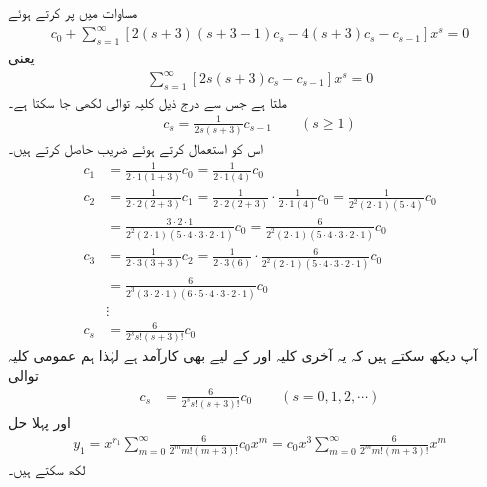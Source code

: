 مساوات  میں  پر کرتے ہوئے
 \begin{align*}
[2\cdot 3(3-1)-4\cdot 3]c_0+\sum_{s=1}^{\infty}[2 (s+3)(s+3-1)c_s-4(s+3)c_s-c_{s-1}]x^{s}=0
\end{align*}
یعنی
 \begin{align*}
\sum_{s=1}^{\infty}[2s(s+3)c_s-c_{s-1}]x^{s}=0
\end{align*}
ملتا ہے جس سے درج ذیل کلیہ توالی لکھی جا سکتا ہے۔
\begin{align*}
c_s=\frac{1}{2s(s+3)}c_{s-1}\quad \quad (s\ge 1)
\end{align*}
اس کو استعمال کرتے ہوئے  ضریب  حاصل کرتے ہیں۔
\begin{align*}
c_1&=\frac{1}{2\cdot 1(1+3)}c_0=\frac{1}{2\cdot 1 (4)}c_0\\
c_2&=\frac{1}{2\cdot 2(2+3)}c_1=\frac{1}{2\cdot 2(2+3)}\cdot \frac{1}{2\cdot 1 (4)}c_0=\frac{1}{2^2(2\cdot 1)(5\cdot 4)}c_0\\
&=\frac{3\cdot 2\cdot 1}{2^2(2\cdot 1)(5\cdot 4\cdot 3\cdot 2\cdot 1)}c_0=\frac{6}{2^2(2\cdot 1)(5\cdot 4\cdot 3\cdot 2\cdot 1)}c_0\\
c_3&=\frac{1}{2\cdot 3(3+3)}c_2=\frac{1}{2\cdot 3(6)}\cdot \frac{6}{2^2(2\cdot 1)(5\cdot 4\cdot 3\cdot 2\cdot 1)}c_0\\
&=\frac{6}{2^3(3\cdot 2\cdot 1)(6\cdot 5\cdot 4\cdot 3\cdot 2\cdot 1)}c_0\\
&\vdots\\
c_s&=\frac{6}{2^s s!(s+3)!}c_0
\end{align*}
آپ دیکھ سکتے ہیں کہ یہ آخری کلیہ  اور  کے لیے بھی کارآمد ہے لہٰذا ہم عمومی کلیہ توالی
\begin{align*}
c_s&=\frac{6}{2^s s!(s+3)!}c_0\quad \quad (s=0,1,2,\cdots)
\end{align*}
اور پہلا حل
\begin{align*}
y_1=x^{r_1}\sum_{m=0}^{\infty}\frac{6}{2^m m!(m+3)!}c_0x^m=c_0x^3\sum_{m=0}^{\infty}\frac{6}{2^m m!(m+3)!}x^m
\end{align*}
لکھ سکتے ہیں۔

